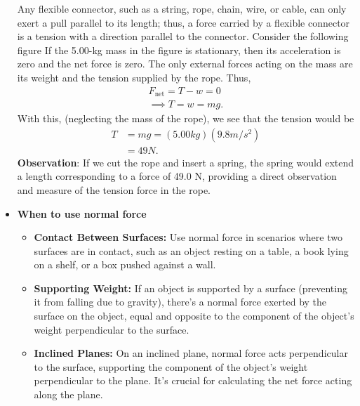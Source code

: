 \documentclass{report}
\begin{document}
\begin{itemize}
                \smallbreak \noindent
                Any flexible connector, such as a string, rope, chain, wire, or cable, can only exert a pull parallel to its length; thus, a force carried by a flexible connector is a tension with a direction parallel to the connector.
                \smallbreak \noindent
                Consider the following figure
                \bigbreak \noindent 
                \bigbreak \noindent 
                If the 5.00-kg mass in the figure is stationary, then its acceleration is zero and the net force is zero. The only external forces acting on the mass are its weight and the tension supplied by the rope. Thus,
                \begin{align*}
                    F_{\text{net}} = T - w = 0 \\
                    \implies  T = w = mg
                .\end{align*}
                With this, (neglecting the mass of the rope), we see that the tension would be
                \begin{align*}
                    T &= mg = (5.00kg)(9.8 m/s^{2}) \\
                    &=49N
                .\end{align*}
                \bigbreak \noindent 
                \textbf{Observation}: If we cut the rope and insert a spring, the spring would extend a length corresponding to a force of 49.0 N, providing a direct observation and measure of the tension force in the rope.
            \item \textbf{When to use normal force}
                \begin{itemize}
                    \item \textbf{Contact Between Surfaces:} Use normal force in scenarios where two surfaces are in contact, such as an object resting on a table, a book lying on a shelf, or a box pushed against a wall.
                    \item \textbf{Supporting Weight:} If an object is supported by a surface (preventing it from falling due to gravity), there's a normal force exerted by the surface on the object, equal and opposite to the component of the object's weight perpendicular to the surface.
                    \item \textbf{Inclined Planes:} On an inclined plane, normal force acts perpendicular to the surface, supporting the component of the object's weight perpendicular to the plane. It's crucial for calculating the net force acting along the plane.

\end{itemize}
\end{itemize}
\end{document}
